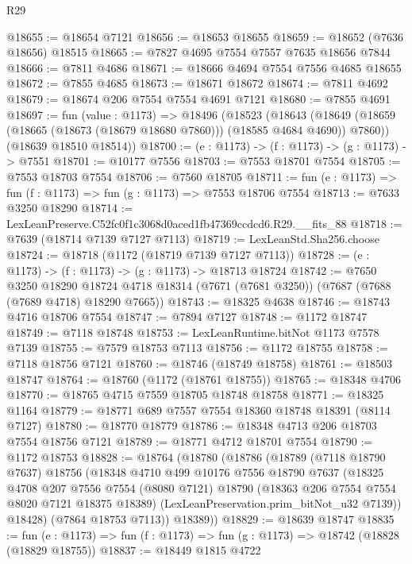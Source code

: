 \begin{lexlean}{R29}
\begin{coremodule}
@18655 := @18654 @7121
@18656 := @18653 @18655
@18659 := @18652 (@7636 @18656) @18515
@18665 := @7827 @4695 @7554 @7557 @7635 @18656 @7844
@18666 := @7811 @4686
@18671 := @18666 @4694 @7554 @7556 @4685 @18655
@18672 := @7855 @4685
@18673 := @18671 @18672
@18674 := @7811 @4692
@18679 := @18674 @206 @7554 @7554 @4691 @7121
@18680 := @7855 @4691
@18697 := fun (value : @1173) =>
  @18496
    (@18523
      (@18643 (@18649 (@18659 (@18665 (@18673 (@18679 @18680 @7860))) (@18585 @4684 @4690)) @7860))
      (@18639 @18510 @18514))
@18700 := (e : @1173) -> (f : @1173) -> (g : @1173) -> @7551
@18701 := @10177 @7556
@18703 := @7553 @18701 @7554
@18705 := @7553 @18703 @7554
@18706 := @7560 @18705
@18711 := fun (e : @1173) => fun (f : @1173) => fun (g : @1173) => @7553 @18706 @7554
@18713 := @7633 @3250 @18290
@18714 := LexLeanPreserve.C52fc0f1c3068d0aced1fb47369ccdcd6.R29.__fits_88
@18718 := @7639 (@18714 @7139 @7127 @7113)
@18719 := LexLeanStd.Sha256.choose
@18724 := @18718 (@1172 (@18719 @7139 @7127 @7113))
@18728 := (e : @1173) -> (f : @1173) -> (g : @1173) -> @18713 @18724
@18742 := @7650
    @3250
    @18290
    @18724
    @4718
    @18314
    (@7671 (@7681 @3250))
    (@7687 (@7688 (@7689 @4718) @18290 @7665))
@18743 := @18325 @4638
@18746 := @18743 @4716 @18706 @7554
@18747 := @7894 @7127
@18748 := @1172 @18747
@18749 := @7118 @18748
@18753 := LexLeanRuntime.bitNot @1173 @7578 @7139
@18755 := @7579 @18753 @7113
@18756 := @1172 @18755
@18758 := @7118 @18756 @7121
@18760 := @18746 (@18749 @18758)
@18761 := @18503 @18747
@18764 := @18760 (@1172 (@18761 @18755))
@18765 := @18348 @4706
@18770 := @18765 @4715 @7559 @18705 @18748 @18758
@18771 := @18325 @1164
@18779 := @18771 @689 @7557 @7554 @18360 @18748 @18391 (@8114 @7127)
@18780 := @18770 @18779
@18786 := @18348 @4713 @206 @18703 @7554 @18756 @7121
@18789 := @18771 @4712 @18701 @7554
@18790 := @1172 @18753
@18828 := @18764
    (@18780
      (@18786
        (@18789
          (@7118 @18790 @7637)
          @18756
          (@18348
            @4710
            @499
            @10176
            @7556
            @18790
            @7637
            (@18325
              @4708
              @207
              @7556
              @7554
              (@8080 @7121)
              @18790
              (@18363 @206 @7554 @7554 @8020 @7121 @18375 @18389)
              (LexLeanPreservation.prim_bitNot_u32 @7139))
            @18428)
          (@7864 @18753 @7113))
        @18389))
@18829 := @18639 @18747
@18835 := fun (e : @1173) => fun (f : @1173) => fun (g : @1173) => @18742 (@18828 (@18829 @18755))
@18837 := @18449 @1815 @4722

\end{coremodule}
\end{lexlean}

